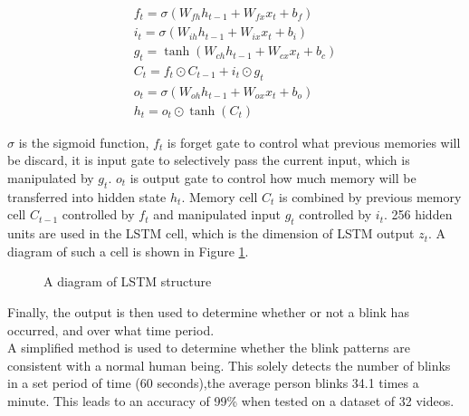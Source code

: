\documentclass{article}
\begin{document}
\begin{equation}
\begin{array}{l}
    f_t = \sigma \left( W_{fh} h_{t-1} + W_{fx} x_t + b _f \right) \\
    i_t = \sigma \left( W_{ih} h_{t-1} + W_{ix} x_t + b_i \right) \\
    g_t = \tanh \left( W_{ch} h_{t-1} + W_{cx} x_t + b_c \right) \\
    C_t = f_t \odot C_{t-1} + i_t \odot g_t \\
    o_t = \sigma \left( W_{oh} h_{t-1} + W_{ox} x_t + b_o \right) \\
    h_t = o_t \odot \tanh \left( C_t \right)
\end{array}
\end{equation}

$\sigma$ is the sigmoid function, $f_t$ is forget gate to control what previous memories will be discard, it is input gate to selectively pass the current input, which is manipulated by $g_t$. $o_t$ is output gate to control how much memory will be transferred into hidden state $h_t$. Memory cell $C_t$ is combined by previous memory cell $C_{t-1}$ controlled by $f_t$ and manipulated input $g_t$ controlled by $i_t$. 256 hidden units are used in the LSTM cell, which is the dimension of LSTM output $z_t$\cite{ictuoculi}. A diagram of such a cell is shown in Figure \ref{fig:LSTM}.

\begin{figure}[H]
    \centering
    \caption{A diagram of LSTM structure\cite{ictuoculi}}
    \label{fig:LSTM}
\end{figure}

Finally, the output is then used to determine whether or not a blink has occurred, and over what time period.\\

A simplified method is used to determine whether the blink patterns are consistent with a normal human being. This solely detects the number of blinks in a set period of time (60 seconds),the average person blinks 34.1 times a minute. This leads to an accuracy of 99\% when tested on a dataset of 32 videos.
\end{document}
